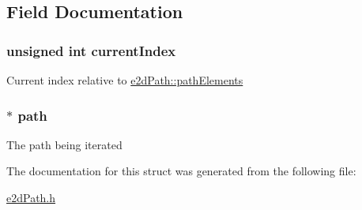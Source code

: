 \subsection{Field Documentation}
\hypertarget{structe2dPathElementIterator_a932f59c8e81a171eb21af8d204d1c13d}{
\subsubsection[{current\-Index}]{\setlength{\rightskip}{0pt plus 5cm}unsigned int {\bf current\-Index}}}\label{structe2dPathElementIterator_a932f59c8e81a171eb21af8d204d1c13d}
Current index relative to \hyperlink{structe2dPath_ac0c8a45ff4f8d02e557fb33887743439}{e2d\-Path\-::path\-Elements} \hypertarget{structe2dPathElementIterator_a318773d3a24970f193ecb5e2fcdce1a7}{
\subsubsection[{path}]{$\ast$ {\bf path}}}\label{structe2dPathElementIterator_a318773d3a24970f193ecb5e2fcdce1a7}
The path being iterated 

The documentation for this struct was generated from the following file\-:\begin{DoxyCompactItemize}
\item 
\hyperlink{e2dPath_8h}{e2d\-Path.\-h}\end{DoxyCompactItemize}
